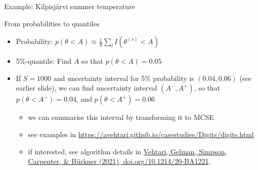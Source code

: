 \documentclass[english,t]{beamer}
\begin{document}
\begin{frame}{Example: Kilpisjärvi summer temperature}
\begin{center}
  \end{center}

\end{frame}

\begin{frame}{From probabilities to quantiles}

  \begin{itemize}
  \item Probability: $p(\theta < A)\approx \frac{1}{S}\sum_l I(\theta^{(s)} < A)$
  \item 5\%-quantile: Find $A$ so that $p(\theta < A)=0.05$
  \item<2-> If $S=1000$ and uncertainty interval for 5\% probability
    is $(0.04,0.06)$ (see earlier slide), we can find uncertainty
    interval $(A^-,A^+)$, so that $p(\theta < A^-)=0.04$, and
    $p(\theta < A^+)=0.06$
    \begin{itemize}
    \item<3-> we can summarise this interval by transforming it to MCSE
    \item<3-> see examples in \url{https://avehtari.github.io/casestudies/Digits/digits.html}
    \item<3-> {\color{gray}if interested, see algorithm details in \href{https://doi.org/10.1214/20-BA1221}{Vehtari, Gelman, Simpson, Carpenter, \& Bürkner (2021), doi.org/10.1214/20-BA1221}.}
    \end{itemize}
  \end{itemize}
  
\end{frame}
\end{document}
